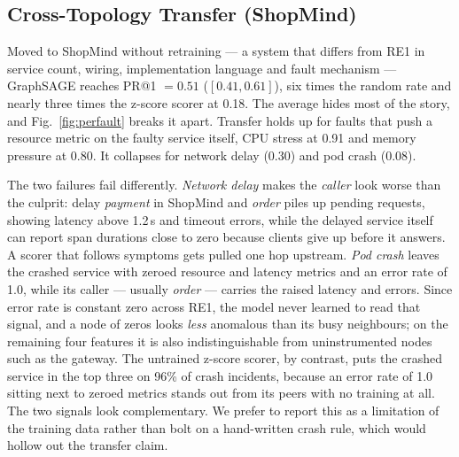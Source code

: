 \documentclass[conference,a4paper]{IEEEtran}
\begin{document}
\subsection{Cross-Topology Transfer (ShopMind)}
Moved to ShopMind without retraining --- a system that differs from RE1 in service count, wiring, implementation language and fault mechanism --- GraphSAGE reaches PR@1 $=0.51$ ($[0.41,0.61]$), six times the random rate and nearly three times the z-score scorer at 0.18. The average hides most of the story, and Fig.~\ref{fig:perfault} breaks it apart. Transfer holds up for faults that push a resource metric on the faulty service itself, CPU stress at 0.91 and memory pressure at 0.80. It collapses for network delay (0.30) and pod crash (0.08).

The two failures fail differently. \emph{Network delay} makes the \emph{caller} look worse than the culprit: delay \emph{payment} in ShopMind and \emph{order} piles up pending requests, showing latency above 1.2\,s and timeout errors, while the delayed service itself can report span durations close to zero because clients give up before it answers. A scorer that follows symptoms gets pulled one hop upstream. \emph{Pod crash} leaves the crashed service with zeroed resource and latency metrics and an error rate of 1.0, while its caller --- usually \emph{order} --- carries the raised latency and errors. Since error rate is constant zero across RE1, the model never learned to read that signal, and a node of zeros looks \emph{less} anomalous than its busy neighbours; on the remaining four features it is also indistinguishable from uninstrumented nodes such as the gateway. The untrained z-score scorer, by contrast, puts the crashed service in the top three on 96\% of crash incidents, because an error rate of 1.0 sitting next to zeroed metrics stands out from its peers with no training at all. The two signals look complementary. We prefer to report this as a limitation of the training data rather than bolt on a hand-written crash rule, which would hollow out the transfer claim.
\end{document}
